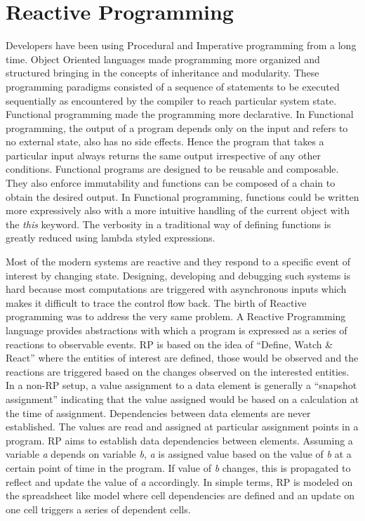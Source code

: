 \section {Reactive Programming}
Developers have been using Procedural and Imperative programming from a long time. 
Object Oriented languages made programming more organized and structured bringing in the concepts of inheritance and modularity. 
These programming paradigms consisted of a sequence of statements to be executed sequentially as encountered by the compiler to reach particular system state. 
Functional programming made the programming more declarative. 
In Functional programming, the output of a program depends only on the input and refers to no external state, also has no side effects\cite{Gifford:1986:IFI:319838.319848}. 
Hence the program that takes a particular input always returns the same output irrespective of any other conditions.
Functional programs are designed to be reusable and composable. 
They also enforce immutability and functions can be composed of a chain to obtain the desired output. 
In Functional programming, functions could be written more expressively also with a more intuitive handling of the current object with the \textit{this} keyword. 
The verbosity in a traditional way of defining functions is greatly reduced using lambda styled expressions.

Most of the modern systems are reactive and they respond to a specific event of interest by changing state. 
Designing, developing and debugging such systems is hard because most computations are triggered with asynchronous inputs which makes it difficult to trace the control flow back\cite{Margara:2014:WDD:2611286.2611290}. 
The birth of Reactive programming was to address the very same problem. A Reactive Programming language provides abstractions with which a program is expressed as a series of reactions to observable events\cite{Bainomugisha:2013:SRP:2501654.2501666}. 
RP is based on the idea of ``Define, Watch \& React''\cite{RPvsFP} where the entities of interest are defined, those would be observed and the reactions are triggered based on the changes observed on the interested entities. 
In a non-RP setup, a value assignment to a data element is generally a ``snapshot assignment'' indicating that the value assigned would be based on a calculation at the time of assignment. 
Dependencies between data elements are never established. The values are read and assigned at particular assignment points in a program. 
RP aims to establish data dependencies between elements. 
Assuming a variable \textit{a} depends on variable \textit{b}, \textit{a} is assigned value based on the value of \textit{b} at a certain point of time in the program. 
If value of \textit{b} changes, this is propagated to reflect and update the value of \textit{a} accordingly. 
In simple terms, RP is modeled on the spreadsheet like model where cell dependencies are defined and an update on one cell triggers a series of dependent cells\cite{Bainomugisha:2013:SRP:2501654.2501666}.

